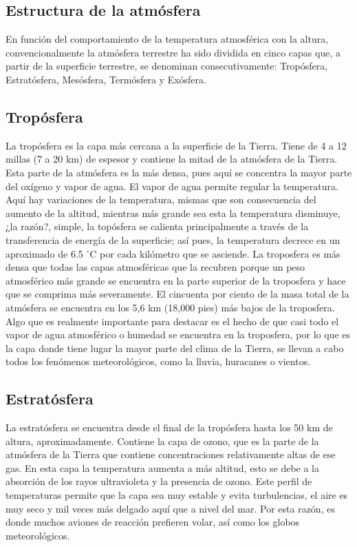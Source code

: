 \documentclass{article}
\begin{document}
\begin{doublespace}
\section{Estructura de la atmósfera}
En función del comportamiento de la temperatura atmosférica con la altura, convencionalmente la atmósfera terrestre ha sido dividida en cinco capas que, a partir de la superficie terrestre, se denominan consecutivamente: Tropósfera, Estratósfera, Mesósfera, Termósfera y Exósfera.

\subsection{Tropósfera}
La tropósfera es la capa más cercana a la superficie de la Tierra. Tiene de 4 a 12 millas (7 a 20 km) de espesor y contiene la mitad de la atmósfera de la Tierra. Esta parte de la atmósfera es la más densa, pues aquí se concentra la mayor parte del oxígeno y vapor de agua. El vapor de agua permite regular la temperatura. 
\\
Aquí hay variaciones de la temperatura, mismas que son consecuencia del aumento de la altitud, mientras más grande sea esta la temperatura disminuye, ¿la razón?, simple, la topósfera se calienta principalmente a través de la transferencia de energía de la superficie; así pues, la temperatura decrece en un aproximado de 6.5 $^{\circ}$C por cada kilómetro que se asciende.  La troposfera es más densa que todas las capas atmosféricas que la recubren porque un peso atmosférico más grande se encuentra en la parte superior de la troposfera y hace que se comprima más severamente. El cincuenta por ciento de la masa total de la atmósfera se encuentra en los 5,6 km (18,000 pies) más bajos de la troposfera.
\\
Algo que es realmente importante para destacar es el hecho de que casi todo el vapor de agua atmosférico o humedad se encuentra en la troposfera, por lo que es la capa donde tiene lugar la mayor parte del clima de la Tierra, se llevan a cabo todos los fenómenos meteorológicos, como la lluvia, huracanes o vientos.

\subsection{Estratósfera}
La estratósfera se encuentra desde el final de la tropósfera hasta los 50 km de altura, aproximadamente. Contiene la capa de ozono, que es la parte de la atmósfera de la Tierra que contiene concentraciones relativamente altas de ese gas. En esta capa la temperatura aumenta a más altitud, esto se debe a la absorción de los rayos ultravioleta y la presencia de ozono. Este perfil de temperaturas permite que la capa sea muy estable y evita turbulencias, el aire es muy seco y mil veces más delgado aquí que a nivel del mar. Por esta razón, es donde muchos aviones de reacción prefieren volar, así como los globos meteorológicos.


\end{doublespace}
\end{document}

